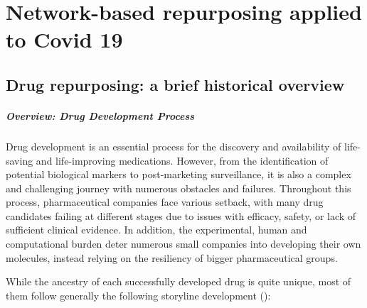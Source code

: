 \chapter{Network-based repurposing applied to Covid 19}
\label{chap:covid19}

\section{Drug repurposing: a brief historical overview}
\label{sec:drug-repurposing}

\paragraph{Overview: Drug Development Process}
\label{para:drug-development}

Drug development is an essential process for the discovery and availability of life-saving and life-improving medications. However, from the identification of potential biological markers to post-marketing surveillance, it is also a complex and challenging journey with numerous obstacles and failures. Throughout this process, pharmaceutical companies face various setback, with many drug candidates failing at different stages due to issues with efficacy, safety, or lack of sufficient clinical evidence. In addition, the experimental, human and computational burden deter numerous small companies into developing their own molecules, instead relying on the resiliency of bigger pharmaceutical groups. 


While the ancestry of each successfully developed drug is quite unique, most of them follow generally the following storyline development ():

